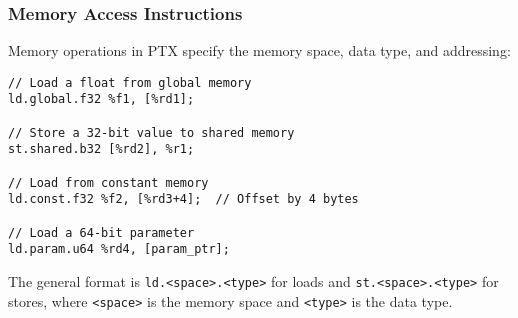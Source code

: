 \subsubsection{Memory Access Instructions}

Memory operations in PTX specify the memory space, data type, and addressing:

\begin{lstlisting}[style=ptx]
// Load a float from global memory
ld.global.f32 %f1, [%rd1];

// Store a 32-bit value to shared memory
st.shared.b32 [%rd2], %r1;

// Load from constant memory
ld.const.f32 %f2, [%rd3+4];  // Offset by 4 bytes

// Load a 64-bit parameter
ld.param.u64 %rd4, [param_ptr];
\end{lstlisting}

The general format is \texttt{ld.<space>.<type>} for loads and \texttt{st.<space>.<type>} for stores, where \texttt{<space>} is the memory space and \texttt{<type>} is the data type.


